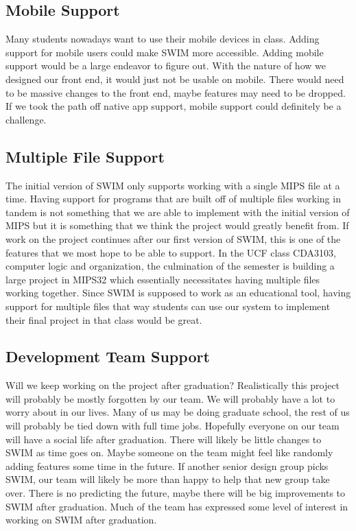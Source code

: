 \documentclass[
    paper=letter,
    parskip=half,
    fontsize=12pt,
    titlepage=firstiscover,
    toc=bibliography,
    numbers=endperiod
]{scrartcl}
\begin{document}
\subsection{Mobile Support}

Many students nowadays want to use their mobile devices in class. Adding
support for mobile users could make SWIM more accessible. Adding mobile
support would be a large endeavor to figure out. With the nature of how
we designed our front end, it would just not be usable on mobile. There
would need to be massive changes to the front end, maybe features may
need to be dropped. If we took the path off native app support, mobile
support could definitely be a challenge.

\subsection{Multiple File Support}

The initial version of SWIM only supports working with a single MIPS
file at a time. Having support for programs that are built off of
multiple files working in tandem is not something that we are able to
implement with the initial version of MIPS but it is something that we
think the project would greatly benefit from. If work on the project
continues after our first version of SWIM, this is one of the features
that we most hope to be able to support. In the UCF class CDA3103,
computer logic and organization, the culmination of the semester is
building a large project in MIPS32 which essentially necessitates having
multiple files working together. Since SWIM is supposed to work as an
educational tool, having support for multiple files that way students
can use our system to implement their final project in that class would
be great.

\subsection{Development Team Support}

Will we keep working on the project after graduation? Realistically this
project will probably be mostly forgotten by our team. We will probably
have a lot to worry about in our lives. Many of us may be doing graduate
school, the rest of us will probably be tied down with full time jobs.
Hopefully everyone on our team will have a social life after graduation.
There will likely be little changes to SWIM as time goes on. Maybe
someone on the team might feel like randomly adding features some time
in the future. If another senior design group picks SWIM, our team will
likely be more than happy to help that new group take over. There is no
predicting the future, maybe there will be big improvements to SWIM
after graduation. Much of the team has expressed some level of interest
in working on SWIM after graduation.


\printbibliography
\end{document}
